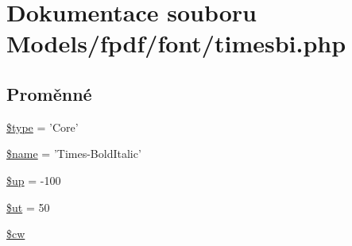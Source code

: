 \hypertarget{timesbi_8php}{\section{Dokumentace souboru Models/fpdf/font/timesbi.php}
\label{timesbi_8php}
}
\subsection*{Proměnné}
\begin{DoxyCompactItemize}
\item 
\hyperlink{timesbi_8php_a9a4a6fba2208984cabb3afacadf33919}{\$type} = 'Core'
\item 
\hyperlink{timesbi_8php_ab2fc40d43824ea3e1ce5d86dee0d763b}{\$name} = 'Times-\/Bold\-Italic'
\item 
\hyperlink{timesbi_8php_a6b5ad2ac55f9df46e8f34e78fbd6f176}{\$up} = -\/100
\item 
\hyperlink{timesbi_8php_aadd3f841051043ee58e587e840e8dd0b}{\$ut} = 50
\item 
\hyperlink{timesbi_8php_ac2951b03dbb0317e6c61ec920b7479dc}{\$cw}
\end{DoxyCompactItemize}


